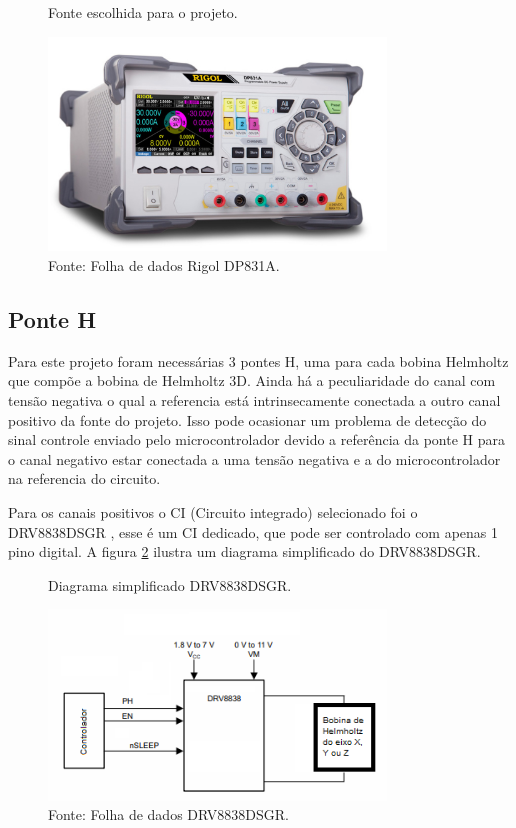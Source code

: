 \begin{figure}[H]
    \centering
     \caption{Fonte escolhida para o projeto.}
     \includegraphics[width=0.8\textwidth]{./img/bob/fonte.png}
     \caption*{Fonte: Folha de dados Rigol DP831A.}
     \label{fig:font}
\end{figure}

\subsection{Ponte H}

Para este projeto foram necessárias 3 pontes H, uma para cada bobina Helmholtz que compõe a bobina de Helmholtz 3D. Ainda há a peculiaridade do canal com tensão negativa o qual a referencia está intrinsecamente conectada a outro canal positivo da fonte do projeto. Isso pode ocasionar um problema de detecção do sinal controle enviado pelo microcontrolador devido a referência da ponte H para o canal negativo estar conectada a uma tensão negativa e a do microcontrolador na referencia do circuito.

Para os canais positivos o CI (Circuito integrado) selecionado foi o DRV8838DSGR \cite{drv8838}, esse é um CI  dedicado, que pode ser controlado com apenas 1 pino digital. A figura \ref{fig:pontHCI} ilustra um diagrama simplificado do DRV8838DSGR.

\begin{figure}[H]
    \centering
     \caption{Diagrama simplificado DRV8838DSGR.}
     \includegraphics[width=0.8\textwidth]{./img/imagensExplicacoes/ponteHCI.png}
     \caption*{Fonte: Folha de dados DRV8838DSGR.\cite{drv8838}}
     \label{fig:pontHCI}
\end{figure}

